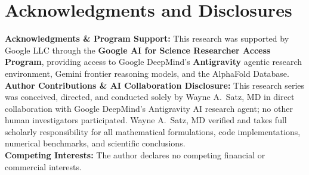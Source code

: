 \documentclass[11pt]{article}
\begin{document}
\section*{Acknowledgments and Disclosures}
\small
\noindent\textbf{Acknowledgments \& Program Support:} This research was supported by Google LLC through the \textbf{Google AI for Science Researcher Access Program}, providing access to Google DeepMind's \textbf{Antigravity} agentic research environment, Gemini frontier reasoning models, and the AlphaFold Database.\\[0.25em]
\noindent\textbf{Author Contributions \& AI Collaboration Disclosure:} This research series was conceived, directed, and conducted solely by Wayne A.~Satz, MD in direct collaboration with Google DeepMind's Antigravity AI research agent; no other human investigators participated. Wayne A.~Satz, MD verified and takes full scholarly responsibility for all mathematical formulations, code implementations, numerical benchmarks, and scientific conclusions.\\[0.25em]
\noindent\textbf{Competing Interests:} The author declares no competing financial or commercial interests.



\end{document}
